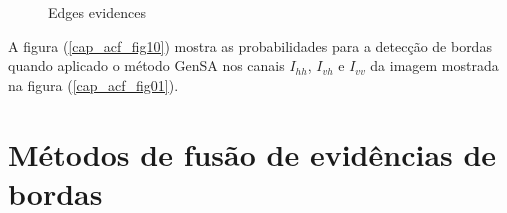 \documentclass[conference]{IEEEtran}
\begin{document}
\begin{figure}[!ht]
     \centering
     \caption{Edges evidences}
     \label{fig_03}
   \end{figure}	



	A figura (\ref{cap_acf_fig10}) mostra as probabilidades para a detecção de bordas quando aplicado o método GenSA nos canais $I_{hh}$, $I_{vh}$ e $I_{vv}$ da imagem mostrada na figura (\ref{cap_acf_fig01}).  

\section{Métodos de fusão de evidências de bordas}\label{sec_06}
\end{document}
